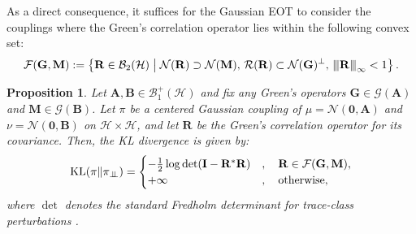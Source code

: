 \documentclass[noinfoline]{imsart}\setcounter{tocdepth}{2}
\newcommand{\m}[1]{\mathbf{#1}}
\renewcommand{\c}[1]{\mathcal{#1}}
\newcommand{\indep}{\perp\mkern-9.5mu\perp}
\DeclareMathOperator{\KL}{KL}
\newcommand{\vertiii}[1]{{\left\vert\kern-0.25ex\left\vert\kern-0.25ex\left\vert #1 
    \right\vert\kern-0.25ex\right\vert\kern-0.25ex\right\vert}} %
\theoremstyle{plain}
\newtheorem{proposition}[theorem]{Proposition}
\begin{document}
As a direct consequence, it suffices for the Gaussian EOT to consider the couplings where the Green's correlation operator lies within the following convex set:
\begin{align*}
    \c{F}(\m{G}, \m{M}) := \left\{ \m{R} \in \c{B}_{2}(\c{H}) \;\big|\; \c{N}(\m{R}) \supset \c{N}(\m{M}), \, \c{R}(\m{R}) \subset \c{N}(\m{G})^{\perp}, \, \vertiii{\m{R}}_{\infty} < 1 \right\}. 
\end{align*}

\begin{proposition}
Let $\m{A}, \m{B} \in \c{B}_{1}^{+}(\c{H})$ and fix any Green's operators $\m{G} \in \c{G}(\m{A})$ and $\m{M} \in \c{G}(\m{B})$. Let $\pi$ be a centered Gaussian coupling of $\mu = \c{N}(\m{0}, \m{A})$ and $\nu = \c{N}(\m{0}, \m{B})$ on $\c{H} \times \c{H}$, and let $\m{R}$ be the Green's correlation operator for its covariance. Then, the KL divergence is given by:
\begin{align*}
    \KL(\pi \| \pi_{\indep}) = 
    \begin{cases}
        -\frac{1}{2} \log \det(\m{I} - \m{R}^* \m{R}) &, \quad \m{R} \in \c{F}(\m{G}, \m{M}), \\
        +\infty &, \quad \text{otherwise},
    \end{cases}
\end{align*}
where $\det$ denotes the standard Fredholm determinant for trace-class perturbations \cite{gohberg2012traces}.
\end{proposition}
\end{document}
